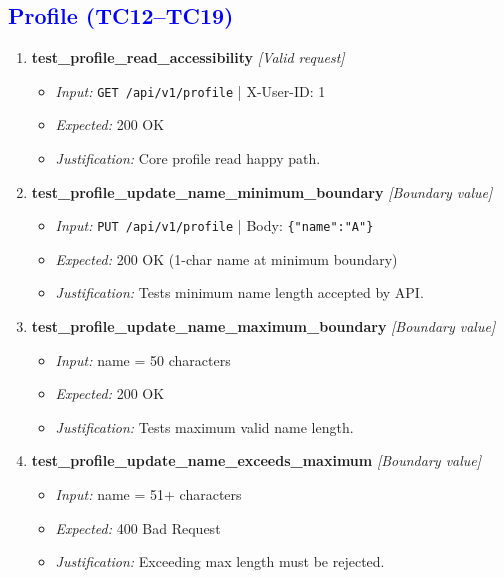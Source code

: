 \documentclass{article}
\begin{document}
\subsection*{\textcolor{blue}{Profile (TC12--TC19)}}
\begin{enumerate}[resume, label=\textbf{TC\arabic*.}]

\item \textbf{test\_profile\_read\_accessibility} \textit{[Valid request]}
\begin{itemize}[noitemsep]
  \item \textit{Input:} \texttt{GET /api/v1/profile} | X-User-ID: 1
  \item \textit{Expected:} 200 OK
  \item \textit{Justification:} Core profile read happy path.
\end{itemize}

\item \textbf{test\_profile\_update\_name\_minimum\_boundary} \textit{[Boundary value]}
\begin{itemize}[noitemsep]
  \item \textit{Input:} \texttt{PUT /api/v1/profile} | Body: \texttt{\{"name":"A"\}}
  \item \textit{Expected:} 200 OK (1-char name at minimum boundary)
  \item \textit{Justification:} Tests minimum name length accepted by API.
\end{itemize}

\item \textbf{test\_profile\_update\_name\_maximum\_boundary} \textit{[Boundary value]}
\begin{itemize}[noitemsep]
  \item \textit{Input:} name = 50 characters
  \item \textit{Expected:} 200 OK
  \item \textit{Justification:} Tests maximum valid name length.
\end{itemize}

\item \textbf{test\_profile\_update\_name\_exceeds\_maximum} \textit{[Boundary value]}
\begin{itemize}[noitemsep]
  \item \textit{Input:} name = 51+ characters
  \item \textit{Expected:} 400 Bad Request
  \item \textit{Justification:} Exceeding max length must be rejected.
\end{itemize}


\end{enumerate}
\end{document}
